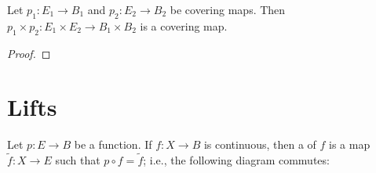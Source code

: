 {\color{red}\begin{example}
\end{example}}

\begin{proposition}
	Let $p_1:E_1 \rightarrow B_1$ and $p_2:E_2\rightarrow B_2$ be covering maps. Then $p_1\times p_2:E_1\times E_2 \rightarrow B_1\times B_2$ is a covering map.
\end{proposition}
	{\color{red}\begin{proof}
		
	\end{proof}}

{\color{red}
\begin{example}
	
\end{example}}

{\color{red}
\begin{example}
	
\end{example}}

{\color{red}
\begin{example}
	
\end{example}}

{\color{red}
\begin{example}
	
\end{example}}

{\color{red}
\begin{example}
	
\end{example}}

{\color{red}
\begin{example}
	
\end{example}}

{\color{red}
\begin{example}
	
\end{example}}

\section{Lifts}

\begin{definition}
	Let $p:E \rightarrow B$ be a function. If $f:X \rightarrow B$ is continuous, then a  of $f$ is a map  $\tilde{f}:X \rightarrow E$ such that $p \circ f = \tilde{f}$; i.e., the following diagram commutes:
	\begin{center}
	\end{center}
\end{definition}


